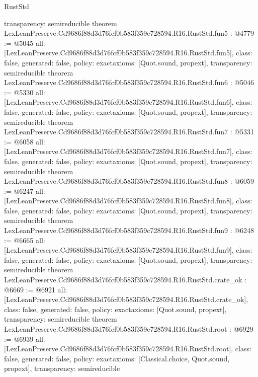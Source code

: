 \begin{lexlean}{RustStd}
\begin{coremodule}
{  transparency: semireducible
}
theorem LexLeanPreserve.Cd9686f88d3d76fcf0b583f359c728594.R16.RustStd.fun5 : @4779 := @5045 {
  all: [LexLeanPreserve.Cd9686f88d3d76fcf0b583f359c728594.R16.RustStd.fun5],
  class: false,
  generated: false,
  policy: exact{axioms: [Quot.sound, propext]},
  transparency: semireducible
}
theorem LexLeanPreserve.Cd9686f88d3d76fcf0b583f359c728594.R16.RustStd.fun6 : @5046 := @5330 {
  all: [LexLeanPreserve.Cd9686f88d3d76fcf0b583f359c728594.R16.RustStd.fun6],
  class: false,
  generated: false,
  policy: exact{axioms: [Quot.sound, propext]},
  transparency: semireducible
}
theorem LexLeanPreserve.Cd9686f88d3d76fcf0b583f359c728594.R16.RustStd.fun7 : @5331 := @6058 {
  all: [LexLeanPreserve.Cd9686f88d3d76fcf0b583f359c728594.R16.RustStd.fun7],
  class: false,
  generated: false,
  policy: exact{axioms: [Quot.sound, propext]},
  transparency: semireducible
}
theorem LexLeanPreserve.Cd9686f88d3d76fcf0b583f359c728594.R16.RustStd.fun8 : @6059 := @6247 {
  all: [LexLeanPreserve.Cd9686f88d3d76fcf0b583f359c728594.R16.RustStd.fun8],
  class: false,
  generated: false,
  policy: exact{axioms: [Quot.sound, propext]},
  transparency: semireducible
}
theorem LexLeanPreserve.Cd9686f88d3d76fcf0b583f359c728594.R16.RustStd.fun9 : @6248 := @6665 {
  all: [LexLeanPreserve.Cd9686f88d3d76fcf0b583f359c728594.R16.RustStd.fun9],
  class: false,
  generated: false,
  policy: exact{axioms: [Quot.sound, propext]},
  transparency: semireducible
}
theorem LexLeanPreserve.Cd9686f88d3d76fcf0b583f359c728594.R16.RustStd.crate_ok : @6669 := @6921 {
  all: [LexLeanPreserve.Cd9686f88d3d76fcf0b583f359c728594.R16.RustStd.crate_ok],
  class: false,
  generated: false,
  policy: exact{axioms: [Quot.sound, propext]},
  transparency: semireducible
}
theorem LexLeanPreserve.Cd9686f88d3d76fcf0b583f359c728594.R16.RustStd.root : @6929 := @6939 {
  all: [LexLeanPreserve.Cd9686f88d3d76fcf0b583f359c728594.R16.RustStd.root],
  class: false,
  generated: false,
  policy: exact{axioms: [Classical.choice, Quot.sound, propext]},
  transparency: semireducible
}


\end{coremodule}
\end{lexlean}
